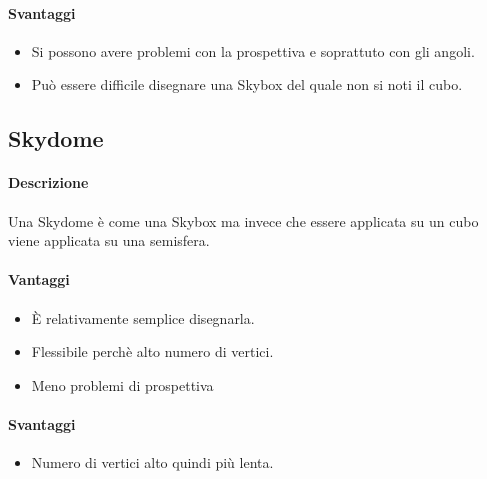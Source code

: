 \documentclass[8pt]{extarticle}
\begin{document}
\begin{multicols}{3}
\paragraph{Svantaggi}
\begin{itemize}
    \item Si possono avere problemi con la prospettiva e soprattuto con gli angoli.
    \item Può essere difficile disegnare una Skybox del quale non si noti il cubo.
\end{itemize}

\subsection{Skydome}
\paragraph{Descrizione} 
Una Skydome è come una Skybox ma invece che essere applicata su un cubo viene applicata
su una semisfera.
\paragraph{Vantaggi}
\begin{itemize}
    \item È relativamente semplice disegnarla.
    \item Flessibile perchè alto numero di vertici.
    \item Meno problemi di prospettiva 
\end{itemize}
\paragraph{Svantaggi}
\begin{itemize}
    \item Numero di vertici alto quindi più lenta.
\end{itemize}








\end{multicols}
\end{document}

